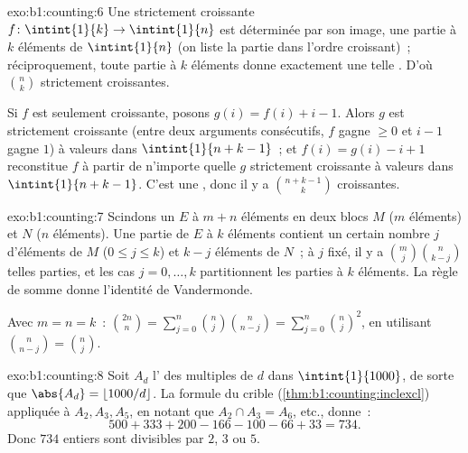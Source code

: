 \begin{solution}{exo:b1:counting:6}
Une  strictement croissante $f \colon \intint{1}{k} \to \intint{1}{n}$
est déterminée par son image, une partie à $k$ éléments de $\intint{1}{n}$
(on liste la partie dans l'ordre croissant)~; réciproquement, toute partie
à $k$ éléments donne exactement une telle . D'où $\binom nk$
 strictement croissantes.

Si $f$ est seulement croissante, posons $g(i) = f(i) + i - 1$. Alors $g$ est
strictement croissante (entre deux arguments consécutifs, $f$ gagne $\geq 0$
et $i - 1$ gagne $1$) à valeurs dans $\intint{1}{n + k - 1}$~; et
$f(i) = g(i) - i + 1$ reconstitue $f$ à partir de n'importe quelle $g$
strictement croissante à valeurs dans $\intint{1}{n+k-1}$. C'est une
, donc il y a $\binom{n + k - 1}{k}$  croissantes.
\end{solution}

\begin{solution}{exo:b1:counting:7}
Scindons un  $E$ à $m + n$ éléments en deux blocs $M$ ($m$ éléments)
et $N$ ($n$ éléments). Une partie de $E$ à $k$ éléments contient un certain
nombre $j$ d'éléments de $M$ ($0 \leq j \leq k$) et $k - j$ éléments de $N$~;
à $j$ fixé, il y a $\binom mj \binom{n}{k-j}$ telles parties, et les cas
$j = 0, \dots, k$ partitionnent les parties à $k$ éléments. La règle de
somme donne l'identité de
Vandermonde.

Avec $m = n = k$~: $\binom{2n}{n} = \sum_{j=0}^{n} \binom nj
\binom{n}{n-j} = \sum_{j=0}^{n} \binom nj^2$, en utilisant $\binom{n}{n-j} =
\binom nj$.
\end{solution}

\begin{solution}{exo:b1:counting:8}
Soit $A_d$ l' des multiples de $d$ dans $\intint{1}{1000}$, de sorte
que $\abs{A_d} = \lfloor 1000/d \rfloor$. La formule du crible
(\cref{thm:b1:counting:inclexcl}) appliquée à $A_2, A_3, A_5$, en notant que
$A_2 \cap A_3 = A_6$, etc., donne~:
\[
500 + 333 + 200 - 166 - 100 - 66 + 33 = 734 .
\]
Donc $734$ entiers sont divisibles par $2$, $3$ ou $5$.
\end{solution}

